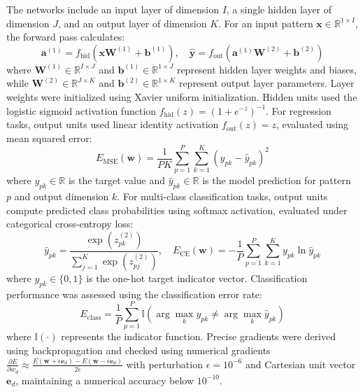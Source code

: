 \documentclass[conference,10pt]{IEEEtran}
\begin{document}
The networks include an input layer of dimension $I$, a single hidden layer of dimension $J$, and an output layer of dimension $K$. For an input pattern $\mathbf{x} \in \mathbb{R}^{1 \times I}$, the forward pass calculates:
\begin{equation}
\mathbf{a}^{(1)} = f_{\text{hid}}(\mathbf{x} \mathbf{W}^{(1)} + \mathbf{b}^{(1)}), \quad \hat{\mathbf{y}} = f_{\text{out}}(\mathbf{a}^{(1)} \mathbf{W}^{(2)} + \mathbf{b}^{(2)})
\end{equation}
where $\mathbf{W}^{(1)} \in \mathbb{R}^{I \times J}$ and $\mathbf{b}^{(1)} \in \mathbb{R}^{1 \times J}$ represent hidden layer weights and biases, while $\mathbf{W}^{(2)} \in \mathbb{R}^{J \times K}$ and $\mathbf{b}^{(2)} \in \mathbb{R}^{1 \times K}$ represent output layer parameters. Layer weights were initialized using Xavier uniform initialization. Hidden units used the logistic sigmoid activation function $f_{\text{hid}}(z) = (1 + e^{-z})^{-1}$. For regression tasks, output units used linear identity activation $f_{\text{out}}(z) = z$, evaluated using mean squared error:
\begin{equation}
E_{\text{MSE}}(\mathbf{w}) = \frac{1}{P K} \sum_{p=1}^P \sum_{k=1}^K (y_{pk} - \hat{y}_{pk})^2
\end{equation}
where $y_{pk} \in \mathbb{R}$ is the target value and $\hat{y}_{pk} \in \mathbb{R}$ is the model prediction for pattern $p$ and output dimension $k$. For multi-class classification tasks, output units compute predicted class probabilities using softmax activation, evaluated under categorical cross-entropy loss:
\begin{equation}
\hat{y}_{pk} = \frac{\exp(z_{pk}^{(2)})}{\sum_{j=1}^K \exp(z_{pj}^{(2)})}, \quad E_{\text{CE}}(\mathbf{w}) = -\frac{1}{P} \sum_{p=1}^P \sum_{k=1}^K y_{pk} \ln \hat{y}_{pk}
\end{equation}
where $y_{pk} \in \{0, 1\}$ is the one-hot target indicator vector. Classification performance was assessed using the classification error rate:
\begin{equation}
E_{\text{class}} = \frac{1}{P} \sum_{p=1}^P \mathbb{I}\left(\arg\max_{k} y_{pk} \ne \arg\max_{k} \hat{y}_{pk}\right)
\end{equation}
where $\mathbb{I}(\cdot)$ represents the indicator function. Precise gradients were derived using backpropagation and checked using numerical gradients $\frac{\partial E}{\partial w_d} \approx \frac{E(\mathbf{w} + \epsilon \mathbf{e}_d) - E(\mathbf{w} - \epsilon \mathbf{e}_d)}{2\epsilon}$ with perturbation $\epsilon = 10^{-6}$ and Cartesian unit vector $\mathbf{e}_d$, maintaining a numerical accuracy below $10^{-10}$.
\end{document}
